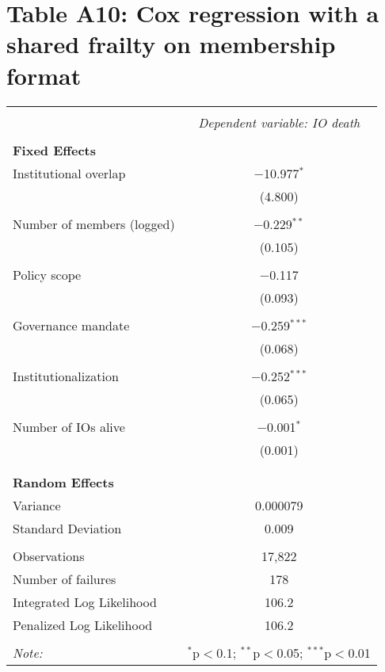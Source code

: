 \documentclass[12pt]{article}
\begin{document}
\section*{Table A10: Cox regression with a shared frailty on membership format}

\begin{table}[H] 
\centering 
\footnotesize
\label{tab:coxme_model} 
\begin{tabular}{@{\extracolsep{5pt}}lc} 
\\[-1.8ex]\hline 
\hline \\[-1.8ex] 
 & \multicolumn{1}{c}{\textit{Dependent variable: IO death}} \\ 
\hline \\[-1.8ex] 
\textbf{Fixed Effects} &  \\ 
Institutional overlap & $-$10.977$^{*}$ \\ 
  & (4.800) \\ 
  & \\ 
Number of members (logged) & $-$0.229$^{**}$ \\ 
  & (0.105) \\ 
  & \\ 
Policy scope & $-$0.117 \\ 
  & (0.093) \\ 
  & \\ 
Governance mandate & $-$0.259$^{***}$ \\ 
  & (0.068) \\ 
  & \\ 
Institutionalization & $-$0.252$^{***}$ \\ 
  & (0.065) \\ 
  & \\ 
Number of IOs alive & $-$0.001$^{*}$ \\ 
  & (0.001) \\ 
  & \\ 
\hline \\[-1.8ex] 
\textbf{Random Effects} &  \\ 
Variance & 0.000079 \\ 
Standard Deviation & 0.009 \\ 
\hline \\[-1.8ex] 
Observations & 17,822 \\ 
Number of failures & 178 \\ 
Integrated Log Likelihood & 106.2 \\ 
Penalized Log Likelihood & 106.2 \\ 
\hline 
\hline \\[-1.8ex] 
\textit{Note:} & \multicolumn{1}{r}{$^{*}$p$<$0.1; $^{**}$p$<$0.05; $^{***}$p$<$0.01} \\ 
\end{tabular} 
\end{table}

\newpage

\printbibliography
\end{document}
